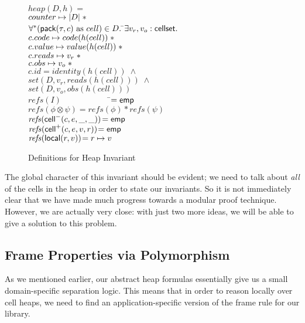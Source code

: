 \begin{figure}
\begin{tabbing}
$heap(D,h) = $ \\
\;\;$counter \mapsto |D| \;* $ \\
\;\;$\forall^* (\mathsf{pack}({\tau}, {c})\mbox{ as }cell) \in D.\;$\=$\exists v_r, v_o : \mathsf{cellset}.\;$ \\
                         \>$c.code \mapsto code(h(cell))   \;* $ \\
                         \>$c.value \mapsto value(h(cell)) \;* $ \\
                         \>$c.reads \mapsto v_r \;* $ \\
                         \>$c.obs   \mapsto v_o \;* $ \\
                         \>$c.id    = identity(h(cell)) \;\land$ \\
                         \>$set(D, v_r, reads(h(cell))) \;\land$ \\
                         \>$set(D, v_o, obs(h(cell)))$ \\[1em]

$\mathit{refs}(I) \qquad\qquad\qquad$\=$= \mathsf{emp}$ \\
$\mathit{refs}(\phi \otimes \psi) $\>$= \mathit{refs}(\phi) * \mathit{refs}(\psi)$ \\
$\mathit{refs}(\mathsf{cell}^{-}({c}, {e}, {\_}, {\_})) $\>$= \mathsf{emp}$ \\
$\mathit{refs}(\mathsf{cell}^{+}({c}, {e}, {v}, {r})) $\>$= \mathsf{emp}$ \\
$\mathit{refs}(\mathsf{local}({r}, {v})) $\>$= r \mapsto v$ \\
\end{tabbing}

\caption{Definitions for Heap Invariant}
\label{heap-invariant}
\end{figure}

The global character of this invariant should be evident; we need to
talk about \emph{all} of the cells in the heap in order to state our
invariants. So it is not immediately clear that we have made much
progress towards a modular proof technique. However, we are actually
very close: with just two more ideas, we will be able to give a
solution to this problem.

\subsection{Frame Properties via Polymorphism}

As we mentioned earlier, our abstract heap formulas essentially give
us a small domain-specific separation logic. This means that in order
to reason locally over cell heaps, we need to find an
application-specific version of the frame rule for our library. 

